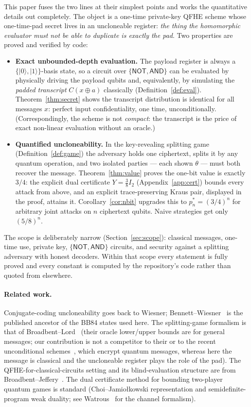 \documentclass[11pt]{article}
\theoremstyle{definition}
\begin{document}
This paper fuses the two lines at their simplest points and works the
quantitative details out completely.  The object is a one-time private-key
QFHE scheme whose one-time-pad secret lives in an uncloneable register:
\emph{the thing the homomorphic evaluator must not be able to duplicate is
exactly the pad}.  Two properties are proved and verified by code:

\begin{itemize}
\item \textbf{Exact unbounded-depth evaluation.}  The payload register is always
a $\{|0\rangle,|1\rangle\}$-basis state, so a circuit over
$\{\mathsf{NOT},\mathsf{AND}\}$ can be evaluated by physically driving the
payload qubits and, equivalently, by simulating the \emph{padded transcript}
$C(x \oplus a)$ classically (Definition~\ref{def:eval}).  Theorem~\ref{thm:secret}
shows the transcript distribution is identical for all messages $x$: perfect
input confidentiality, one time, unconditionally.  (Correspondingly, the scheme
is not \emph{compact}: the transcript is the price of exact non-linear
evaluation without an oracle.)
\item \textbf{Quantified uncloneability.}  In the key-revealing splitting game
(Definition~\ref{def:game}) the adversary holds one ciphertext, splits it by any
quantum operation, and two isolated parties --- each shown $\theta$ --- must both
recover the message.  Theorem~\ref{thm:value} proves the one-bit value is
exactly $3/4$: the explicit dual certificate $Y = \tfrac38 I_2$
(Appendix~\ref{app:cert}) bounds every attack from above, and an explicit
trace-preserving Kraus pair, displayed in the proof, attains it.
Corollary~\ref{cor:nbit} upgrades this to $p_n^\ast = (3/4)^n$ for arbitrary
joint attacks on $n$ ciphertext qubits.  Naive strategies get only $(5/8)^n$.
\end{itemize}

The scope is deliberately narrow (Section~\ref{sec:scope}): classical messages,
one-time use, private key, $\{\mathsf{NOT},\mathsf{AND}\}$ circuits, and security
against a splitting adversary with honest decoders.  Within that scope every
statement is fully proved and every constant is computed by the repository's
code rather than quoted from elsewhere.

\paragraph{Related work.}
Conjugate-coding uncloneability goes back to Wiesner; Bennett--Wiesner~\cite{bw84}
is the published ancestor of the BB84 states used here.  The splitting-game
formalism is that of Broadbent--Lord~\cite{bl20} (their oracle lower/upper bounds
are for general messages; our contribution is not a competitor to their or to
the recent unconditional schemes~\cite{as26,bbc26,bcr26}, which encrypt quantum
messages, whereas here the message is classical and the uncloneable register
plays the role of the pad).  The QFHE-for-classical-circuits setting and its
blind-evaluation structure are from Broadbent--Jeffery~\cite{bj15}.  The dual
certificate method for bounding two-player quantum games is standard
(Choi--Jamio{\l}kowski representation and semidefinite-program weak duality;
see Watrous~\cite{watrous} for the channel formalism).
\end{document}
